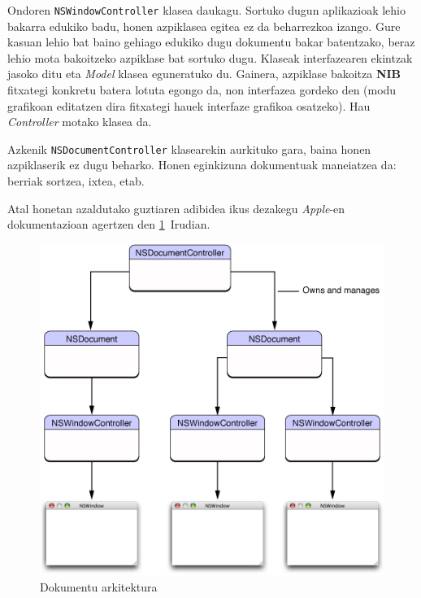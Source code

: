 Ondoren \texttt{NSWindowController} klasea daukagu. Sortuko dugun aplikazioak lehio bakarra edukiko badu, honen azpiklasea egitea ez da beharrezkoa izango. Gure kasuan lehio bat baino gehiago edukiko dugu dokumentu bakar batentzako, beraz lehio mota bakoitzeko azpiklase bat sortuko dugu. Klaseak interfazearen ekintzak jasoko ditu eta \textit{Model} klasea eguneratuko du. Gainera, azpiklase bakoitza \textbf{NIB} fitxategi konkretu batera lotuta egongo da, non interfazea gordeko den (modu grafikoan editatzen dira fitxategi hauek interfaze grafikoa osatzeko). Hau \textit{Controller} motako klasea da.

Azkenik \texttt{NSDocumentController} klasearekin aurkituko gara, baina honen azpiklaserik ez dugu beharko. Honen eginkizuna dokumentuak maneiatzea da: berriak sortzea, ixtea, etab.

Atal honetan azaldutako guztiaren adibidea ikus dezakegu \textit{Apple}-en dokumentazioan agertzen den \ref{nsdoc}~Irudian.

\begin{figure}[htp]
\begin{center}
\includegraphics[scale=0.4]{Pictures/Chapter4/Diseinua/nsdocument.png}
\caption{Dokumentu arkitektura}
\label{nsdoc}
\end{center}
\end{figure}

